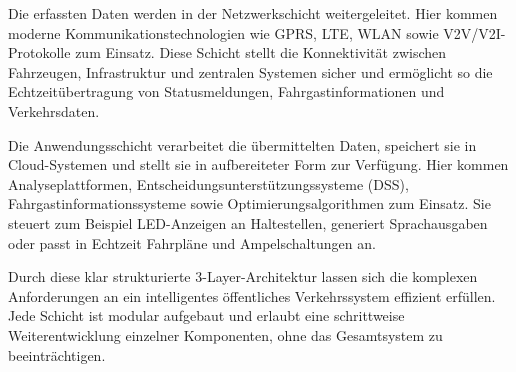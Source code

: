 Die erfassten Daten werden in der Netzwerkschicht weitergeleitet. Hier kommen moderne Kommunikationstechnologien wie GPRS, LTE, WLAN sowie V2V/V2I-Protokolle zum Einsatz. Diese Schicht stellt die Konnektivität zwischen Fahrzeugen, Infrastruktur und zentralen Systemen sicher und ermöglicht so die Echtzeitübertragung von Statusmeldungen, Fahrgastinformationen und Verkehrsdaten.

Die Anwendungsschicht verarbeitet die übermittelten Daten, speichert sie in Cloud-Systemen und stellt sie in aufbereiteter Form zur Verfügung. Hier kommen Analyseplattformen, Entscheidungsunterstützungssysteme (DSS), Fahrgastinformationssysteme sowie Optimierungsalgorithmen zum Einsatz. Sie steuert zum Beispiel LED-Anzeigen an Haltestellen, generiert Sprachausgaben oder passt in Echtzeit Fahrpläne und Ampelschaltungen an.

Durch diese klar strukturierte 3-Layer-Architektur lassen sich die komplexen Anforderungen an ein intelligentes öffentliches Verkehrssystem effizient erfüllen. Jede Schicht ist modular aufgebaut und erlaubt eine schrittweise Weiterentwicklung einzelner Komponenten, ohne das Gesamtsystem zu beeinträchtigen.

